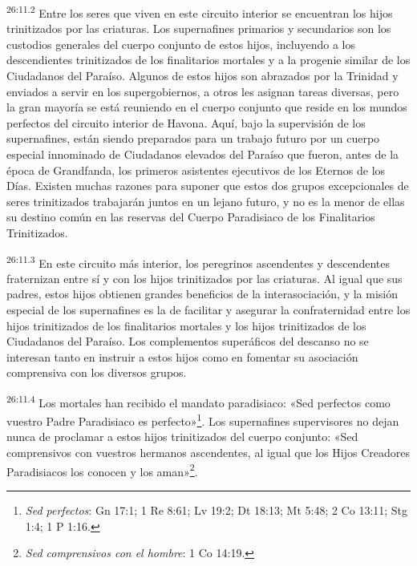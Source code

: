 \par
\textsuperscript{26:11.2} Entre los seres que viven en este circuito interior se encuentran los hijos trinitizados por las criaturas. Los supernafines primarios y secundarios son los custodios generales del cuerpo conjunto de estos hijos, incluyendo a los descendientes trinitizados de los finalitarios mortales y a la progenie similar de los Ciudadanos del Paraíso. Algunos de estos hijos son abrazados por la Trinidad y enviados a servir en los supergobiernos, a otros les asignan tareas diversas, pero la gran mayoría se está reuniendo en el cuerpo conjunto que reside en los mundos perfectos del circuito interior de Havona. Aquí, bajo la supervisión de los supernafines, están siendo preparados para un trabajo futuro por un cuerpo especial innominado de Ciudadanos elevados del Paraíso que fueron, antes de la época de Grandfanda, los primeros asistentes ejecutivos de los Eternos de los Días. Existen muchas razones para suponer que estos dos grupos excepcionales de seres trinitizados trabajarán juntos en un lejano futuro, y no es la menor de ellas su destino común en las reservas del Cuerpo Paradisiaco de los Finalitarios Trinitizados.

\par
\textsuperscript{26:11.3} En este circuito más interior, los peregrinos ascendentes y descendentes fraternizan entre sí y con los hijos trinitizados por las criaturas. Al igual que sus padres, estos hijos obtienen grandes beneficios de la interasociación, y la misión especial de los supernafines es la de facilitar y asegurar la confraternidad entre los hijos trinitizados de los finalitarios mortales y los hijos trinitizados de los Ciudadanos del Paraíso. Los complementos superáficos del descanso no se interesan tanto en instruir a estos hijos como en fomentar su asociación comprensiva con los diversos grupos.

\par
\textsuperscript{26:11.4} Los mortales han recibido el mandato paradisiaco: «Sed perfectos como vuestro Padre Paradisiaco es perfecto»\footnote{\textit{Sed perfectos}: Gn 17:1; 1 Re 8:61; Lv 19:2; Dt 18:13; Mt 5:48; 2 Co 13:11; Stg 1:4; 1 P 1:16.}. Los supernafines supervisores no dejan nunca de proclamar a estos hijos trinitizados del cuerpo conjunto: «Sed comprensivos con vuestros hermanos ascendentes, al igual que los Hijos Creadores Paradisiacos los conocen y los aman»\footnote{\textit{Sed comprensivos con el hombre}: 1 Co 14:19.}.

